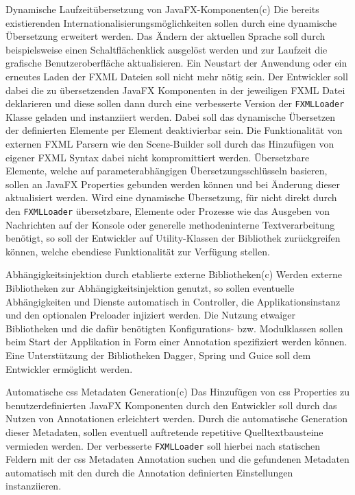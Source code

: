 \begin{freq}{Dynamische Laufzeitübersetzung von JavaFX-Komponenten}(c)
	Die bereits existierenden Internationalisierungsmöglichkeiten sollen durch eine dynamische Übersetzung erweitert werden. Das Ändern der aktuellen Sprache soll durch beispielsweise einen Schaltflächenklick ausgelöst werden und zur Laufzeit die grafische Benutzeroberfläche aktualisieren. Ein Neustart der Anwendung oder ein erneutes Laden der FXML Dateien soll nicht mehr nötig sein. Der Entwickler soll dabei die zu übersetzenden JavaFX Komponenten in der jeweiligen FXML Datei deklarieren und diese sollen dann durch eine verbesserte Version der \texttt{FXMLLoader} Klasse geladen und instanziiert werden. Dabei soll das dynamische Übersetzen der definierten Elemente per Element deaktivierbar sein. Die Funktionalität von externen FXML Parsern wie den Scene-Builder soll durch das Hinzufügen von eigener FXML Syntax dabei nicht kompromittiert werden. Übersetzbare Elemente, welche auf parameterabhängigen Übersetzungsschlüsseln basieren, sollen an JavaFX Properties gebunden werden können und bei Änderung dieser aktualisiert werden. Wird eine dynamische Übersetzung, für nicht direkt durch den \texttt{FXMLLoader} übersetzbare, Elemente oder Prozesse wie das Ausgeben von Nachrichten auf der Konsole oder generelle methodeninterne Textverarbeitung benötigt, so soll der Entwickler auf Utility-Klassen der Bibliothek zurückgreifen können, welche ebendiese Funktionalität zur Verfügung stellen.
\end{freq}
\begin{freq}{Abhängigkeitsinjektion durch etablierte externe Bibliotheken}(c)
	Werden externe Bibliotheken zur Abhängigkeitsinjektion genutzt, so sollen eventuelle Abhängigkeiten und Dienste automatisch in Controller, die Applikationsinstanz und den optionalen Preloader injiziert werden. Die Nutzung etwaiger Bibliotheken und die dafür benötigten Konfigurations- bzw. Modulklassen sollen beim Start der Applikation in Form einer Annotation spezifiziert werden können. Eine Unterstützung der Bibliotheken Dagger, Spring und Guice soll dem Entwickler ermöglicht werden.
\end{freq}
\begin{freq}{Automatische \ac{css} Metadaten Generation}(c)
	Das Hinzufügen von \ac{css} Properties zu benutzerdefinierten JavaFX Komponenten durch den Entwickler soll durch das Nutzen von Annotationen erleichtert werden. Durch die automatische Generation dieser Metadaten, sollen eventuell auftretende repetitive Quelltextbausteine vermieden werden. Der verbesserte \texttt{FXMLLoader} soll hierbei nach statischen Feldern mit der \ac{css} Metadaten Annotation suchen und die gefundenen Metadaten automatisch mit den durch die Annotation definierten Einstellungen instanziieren.
\end{freq}
